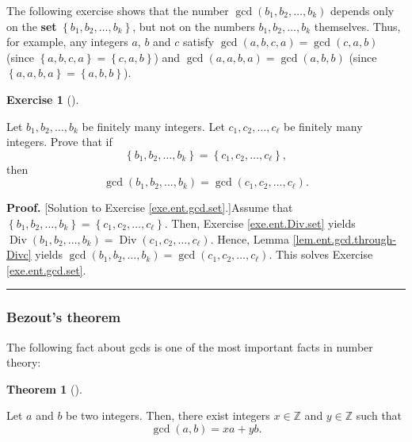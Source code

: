 \documentclass[numbers=enddot,12pt,final,onecolumn,notitlepage]{scrartcl}%
\newcounter{exer}
\numberwithin{exer}{subsection}
\theoremstyle{definition}
\newtheorem{theo}{Theorem}[subsection]
\newenvironment{theorem}[1][]
{\begin{theo}[#1]\begin{leftbar}}
{\end{leftbar}\end{theo}}
\newtheorem{exmp}[exer]{Exercise}
\newenvironment{exercise}[1][]
{\begin{exmp}[#1]\begin{leftbar}}
{\end{leftbar}\end{exmp}}
\newenvironment{fineprint}{\begin{small}}{\end{small}}
\newenvironment{proof}[1][Proof]{\noindent\textbf{#1.} }{\ \rule{0.5em}{0.5em}}
\begin{document}
The following exercise shows that the number $\gcd\left(  b_{1},b_{2}%
,\ldots,b_{k}\right)  $ depends only on the \textbf{set} $\left\{  b_{1}%
,b_{2},\ldots,b_{k}\right\}  $, but not on the numbers $b_{1},b_{2}%
,\ldots,b_{k}$ themselves. Thus, for example, any integers $a$, $b$ and $c$
satisfy $\gcd\left(  a,b,c,a\right)  =\gcd\left(  c,a,b\right)  $ (since
$\left\{  a,b,c,a\right\}  =\left\{  c,a,b\right\}  $) and $\gcd\left(
a,a,b,a\right)  =\gcd\left(  a,b,b\right)  $ (since $\left\{  a,a,b,a\right\}
=\left\{  a,b,b\right\}  $).

\begin{exercise}
\label{exe.ent.gcd.set}Let $b_{1},b_{2},\ldots,b_{k}$ be finitely many
integers. Let $c_{1},c_{2},\ldots,c_{\ell}$ be finitely many integers. Prove
that if%
\[
\left\{  b_{1},b_{2},\ldots,b_{k}\right\}  =\left\{  c_{1},c_{2}%
,\ldots,c_{\ell}\right\}  ,
\]
then%
\[
\gcd\left(  b_{1},b_{2},\ldots,b_{k}\right)  =\gcd\left(  c_{1},c_{2}%
,\ldots,c_{\ell}\right)  .
\]

\end{exercise}

\begin{fineprint}
\begin{proof}
[Solution to Exercise \ref{exe.ent.gcd.set}.]Assume that $\left\{  b_{1}%
,b_{2},\ldots,b_{k}\right\}  =\left\{  c_{1},c_{2},\ldots,c_{\ell}\right\}  $.
Then, Exercise \ref{exe.ent.Div.set} yields $\operatorname*{Div}\left(
b_{1},b_{2},\ldots,b_{k}\right)  =\operatorname*{Div}\left(  c_{1}%
,c_{2},\ldots,c_{\ell}\right)  $. Hence, Lemma \ref{lem.ent.gcd.through-Divc}
yields $\gcd\left(  b_{1},b_{2},\ldots,b_{k}\right)  =\gcd\left(  c_{1}%
,c_{2},\ldots,c_{\ell}\right)  $. This solves Exercise \ref{exe.ent.gcd.set}.
\end{proof}
\end{fineprint}

\subsubsection{Bezout's theorem}

The following fact about gcds is one of the most important facts in number theory:

\begin{theorem}
\label{thm.ent.gcd.bezout}Let $a$ and $b$ be two integers. Then, there exist
integers $x\in\mathbb{Z}$ and $y\in\mathbb{Z}$ such that%
\[
\gcd\left(  a,b\right)  =xa+yb.
\]

\end{theorem}
\end{document}
